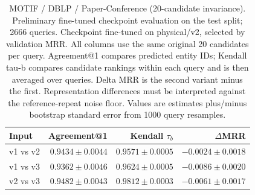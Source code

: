 \begin{table}[t]
\centering
\small
\begin{tabular}{lrrr}
\toprule
Input & Agreement@1 & Kendall $\tau_b$ & $\Delta$MRR \\
\midrule
v1 vs v2 & $0.9434 \pm 0.0044$ & $0.9571 \pm 0.0005$ & $-0.0024 \pm 0.0018$ \\
v1 vs v3 & $0.9362 \pm 0.0046$ & $0.9624 \pm 0.0005$ & $-0.0086 \pm 0.0020$ \\
v2 vs v3 & $0.9482 \pm 0.0043$ & $0.9812 \pm 0.0003$ & $-0.0061 \pm 0.0017$ \\
\bottomrule
\end{tabular}
\caption{MOTIF / DBLP / Paper-Conference (20-candidate invariance). Preliminary fine-tuned checkpoint evaluation on the test split; 2666 queries. Checkpoint fine-tuned on physical/v2, selected by validation MRR. All columns use the same original 20 candidates per query. Agreement@1 compares predicted entity IDs; Kendall tau-b compares candidate rankings within each query and is then averaged over queries. Delta MRR is the second variant minus the first. Representation differences must be interpreted against the reference-repeat noise floor. Values are estimates plus/minus bootstrap standard error from 1000 query resamples.}
\label{tab:motif-paper_conference-invariance}
\end{table}
